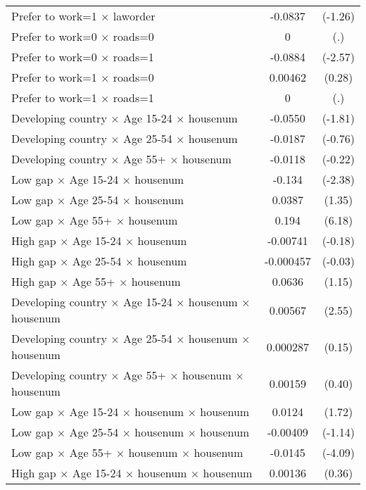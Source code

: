 {\begin{longtable}{l*{1}{cc}}
Prefer to work=1 $\times$ laworder&     -0.0837         &     (-1.26)\\
Prefer to work=0 $\times$ roads=0&           0         &         (.)\\
Prefer to work=0 $\times$ roads=1&     -0.0884\sym{*}  &     (-2.57)\\
Prefer to work=1 $\times$ roads=0&     0.00462         &      (0.28)\\
Prefer to work=1 $\times$ roads=1&           0         &         (.)\\
Developing country $\times$ Age 15-24 $\times$ housenum&     -0.0550         &     (-1.81)\\
Developing country $\times$ Age 25-54 $\times$ housenum&     -0.0187         &     (-0.76)\\
Developing country $\times$ Age 55+ $\times$ housenum&     -0.0118         &     (-0.22)\\
Low gap $\times$ Age 15-24 $\times$ housenum&      -0.134\sym{*}  &     (-2.38)\\
Low gap $\times$ Age 25-54 $\times$ housenum&      0.0387         &      (1.35)\\
Low gap $\times$ Age 55+ $\times$ housenum&       0.194\sym{***}&      (6.18)\\
High gap $\times$ Age 15-24 $\times$ housenum&    -0.00741         &     (-0.18)\\
High gap $\times$ Age 25-54 $\times$ housenum&   -0.000457         &     (-0.03)\\
High gap $\times$ Age 55+ $\times$ housenum&      0.0636         &      (1.15)\\
Developing country $\times$ Age 15-24 $\times$ housenum $\times$ housenum&     0.00567\sym{*}  &      (2.55)\\
Developing country $\times$ Age 25-54 $\times$ housenum $\times$ housenum&    0.000287         &      (0.15)\\
Developing country $\times$ Age 55+ $\times$ housenum $\times$ housenum&     0.00159         &      (0.40)\\
Low gap $\times$ Age 15-24 $\times$ housenum $\times$ housenum&      0.0124         &      (1.72)\\
Low gap $\times$ Age 25-54 $\times$ housenum $\times$ housenum&    -0.00409         &     (-1.14)\\
Low gap $\times$ Age 55+ $\times$ housenum $\times$ housenum&     -0.0145\sym{***}&     (-4.09)\\
High gap $\times$ Age 15-24 $\times$ housenum $\times$ housenum&     0.00136         &      (0.36)\\

\end{longtable}}
